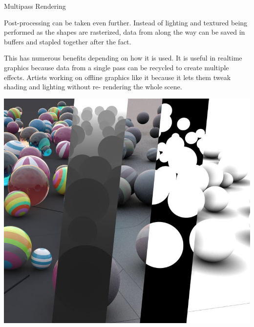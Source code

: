 \documentclass{lug}
\newcommand{\splitslide}[4]{
    \noindent
    \begin{minipage}{#1 \textwidth - #2 }
        #3
    \end{minipage}%
    \hspace{ \dimexpr #2 * 2 \relax }%
    \begin{minipage}{\textwidth - #1 \textwidth - #2 }
        #4
    \end{minipage}
}
\begin{document}
\begin{frame}{Multipass Rendering}
    \splitslide{0.65}{.7em}{
        \small

        Post-processing can be taken even further. Instead of lighting and
        textured being performed as the shapes are rasterized, data from along
        the way can be saved in buffers and stapled together after the fact.

        \vspace{1ex}

        This has numerous benefits depending on how it is used. It is useful
        in realtime graphics because data from a single pass can be recycled
        to create multiple effects. Artists working on offline graphics like
        it because it lets them tweak shading and lighting without re-%
        rendering the whole scene.

    }{
        \includegraphics[width=\textwidth]{graphics/multipass}
    }
\end{frame}
\end{document}
